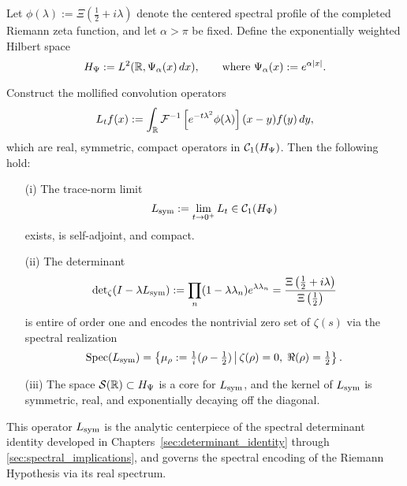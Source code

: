 \begin{theorem}
\label{thm:canonical_operator_realization}
Let \( \phi(\lambda) := \Xi\left( \tfrac{1}{2} + i\lambda \right) \) denote the centered spectral profile of the completed Riemann zeta function, and let \( \alpha > \pi \) be fixed. Define the exponentially weighted Hilbert space
\[
H_{\Psi} := L^2(\mathbb{R}, \Psi_\alpha(x)\, dx), \qquad \text{where } \Psi_\alpha(x) := e^{\alpha |x|}.
\]

Construct the mollified convolution operators
\[
L_t f(x) := \int_{\mathbb{R}} \mathcal{F}^{-1}\left[ e^{-t\lambda^2} \phi(\lambda) \right](x - y) f(y)\, dy,
\]
which are real, symmetric, compact operators in \( \mathcal{C}_1(H_{\Psi}) \). Then the following hold:

\begin{itemize}
    \item[\textup{(i)}] The trace-norm limit
    \[
    L_{\mathrm{sym}} := \lim_{t \to 0^+} L_t \in \mathcal{C}_1(H_{\Psi})
    \]
    exists, is self-adjoint, and compact.

    \item[\textup{(ii)}] The determinant
    \[
    \det\nolimits_\zeta(I - \lambda L_{\mathrm{sym}}) := \prod_n (1 - \lambda \lambda_n) e^{\lambda \lambda_n} = \frac{\Xi\left( \tfrac{1}{2} + i\lambda \right)}{\Xi\left( \tfrac{1}{2} \right)}
    \]
    is entire of order one and encodes the nontrivial zero set of \( \zeta(s) \) via the spectral realization
    \[
    \operatorname{Spec}(L_{\mathrm{sym}}) = \left\{ \mu_\rho := \tfrac{1}{i}(\rho - \tfrac{1}{2}) \,\middle|\, \zeta(\rho) = 0,\; \Re(\rho) = \tfrac{1}{2} \right\}.
    \]

    \item[\textup{(iii)}] The space \( \mathcal{S}(\mathbb{R}) \subset H_{\Psi} \) is a core for \( L_{\mathrm{sym}} \), and the kernel of \( L_{\mathrm{sym}} \) is symmetric, real, and exponentially decaying off the diagonal.
\end{itemize}

This operator \( L_{\mathrm{sym}} \) is the analytic centerpiece of the spectral determinant identity developed in Chapters~\ref{sec:determinant_identity} through \ref{sec:spectral_implications}, and governs the spectral encoding of the Riemann Hypothesis via its real spectrum.
\end{theorem}
